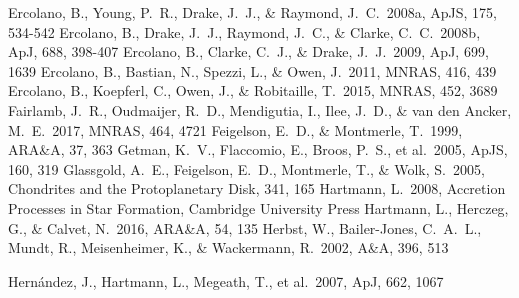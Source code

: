 \documentclass[10pt,fleqn,twoside]{article}
\newcommand*\aap{A\&A}
\newcommand*\apj{ApJ}
\newcommand*\apjs{ApJS}
\newcommand*\araa{ARA\&A}
\newcommand*\mnras{MNRAS}
\begin{document}
\begin{thebibliography}{}
 Ercolano, B., Young, P.~R., Drake, J.~J., \& Raymond, J.~C.\ 2008a, \apjs, 175, 534-542 
 Ercolano, B., Drake, J.~J., Raymond, J.~C., \& Clarke, C.~C.\ 2008b, \apj, 688, 398-407 
 Ercolano, B., Clarke, C.~J., \& Drake, J.~J.\ 2009, \apj, 699, 1639
 Ercolano, B., Bastian, N., Spezzi, L., \& Owen, J.\ 2011, \mnras, 416, 439
 Ercolano, B., Koepferl, C., Owen, J., \& Robitaille, T.\ 2015, \mnras, 452, 3689 
 Fairlamb, J.~R., Oudmaijer, R.~D., Mendigutia, I., Ilee, J.~D., \& van den Ancker, M.~E.\ 2017, \mnras, 464, 4721
 Feigelson, E.~D., \& Montmerle, T.\ 1999, \araa, 37, 363 
 Getman, K.~V., Flaccomio, E., Broos, P.~S., et al.\ 2005, \apjs, 160, 319 
 Glassgold, A.~E., Feigelson, E.~D., Montmerle, T., \& Wolk, S.\ 2005, Chondrites and the Protoplanetary Disk, 341, 165
 Hartmann, L.\ 2008, Accretion Processes in Star Formation,  Cambridge University Press
 Hartmann, L., Herczeg, G., \& Calvet, N.\ 2016, \araa, 54, 135 
 Herbst, W., Bailer-Jones, C.~A.~L., Mundt, R., Meisenheimer, K., \& Wackermann, R.\ 2002, \aap, 396, 513 

 Hern{\'a}ndez, J., Hartmann, L., Megeath, T., et al.\ 2007, \apj, 662, 1067 


\end{thebibliography}
\end{document}
